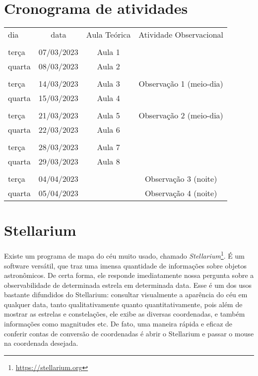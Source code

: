 \section{Cronograma de atividades}

\begin{table}[h]
\begin{center}
\begin{tabular}{lccc}
\rowcolor{mybeige!80!gray}  
dia & data & Aula Teórica & Atividade Observacional \\
&&&\\[-0.2em]
\rowcolor{mybeige}
terça              & 07/03/2023 & Aula 1 & \\
\rowcolor{mybeige}
quarta             & 08/03/2023 & Aula 2 & \\
&&&\\[-0.2em]
\rowcolor{mybeige} 
terça              & 14/03/2023 & Aula 3 & Observação 1 (meio-dia)\\
\rowcolor{mybeige} 
quarta             & 15/03/2023 & Aula 4 & \\
&&&\\[-0.2em]
\rowcolor{mybeige}
terça              & 21/03/2023 & Aula 5 & Observação 2 (meio-dia)\\
\rowcolor{mybeige}
quarta             & 22/03/2023 & Aula 6 & \\
&&&\\[-0.2em]
\rowcolor{mybeige} 
terça              & 28/03/2023 & Aula 7 & \\
\rowcolor{mybeige} 
quarta             & 29/03/2023 & Aula 8 & \\
&&&\\[-0.2em]
\rowcolor{mybeige} 
terça              & 04/04/2023 & & Observação 3 (noite)\\
\rowcolor{mybeige} 
quarta             & 05/04/2023 & & Observação 4 (noite) \\        
\end{tabular}
\end{center}
\end{table}

\newpage
\section{Stellarium}

Existe um programa de mapa do céu muito usado, chamado \textit{Stellarium}\footnote{\url{https://stellarium.org}}. É um software versátil, que traz uma imensa quantidade de informações sobre objetos astronômicos. De certa forma, ele responde imediatamente nossa pergunta sobre a observabilidade de determinada estrela em determinada data. Esse é um dos usos bastante difundidos do Stellarium: consultar visualmente a aparência do céu em qualquer data, tanto qualitativamente quanto quantitativamente, pois além de mostrar as estrelas e constelações, ele exibe as diversas coordenadas, e também informações como magnitudes etc. De fato, uma maneira rápida e eficaz de conferir contas de conversão de coordenadas é abrir o Stellarium e passar o mouse na coordenada desejada.

